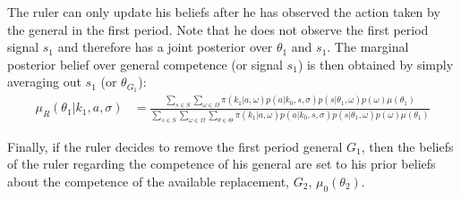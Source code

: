 \documentclass[11pt,]{article}
\begin{document}
The ruler can only update his beliefs after he has observed the action taken by the general in the first period.  Note that he does not observe the first period signal $s_1$ and therefore has a joint posterior over $\theta_{1}$ and $s_1$.  The marginal posterior belief over general competence (or signal $s_1$) is then obtained by simply averaging out $s_1$ (or $\theta_{G_1}$):
\begin{align}
\mu_R(\theta_{1}|k_1,a,\sigma)&=\frac{\sum_{s\in S}\sum_{\omega\in\Omega}\pi(k_1|a,\omega)p(a|k_0,s,\sigma)p(s| \theta_{1},\omega)p(\omega)\mu(\theta_{1})}{\sum_{s\in S}\sum_{\omega\in\Omega}\sum_{\theta\in\Theta}\pi(k_1|a,\omega)p(a|k_0,s,\sigma)p(s|\theta_{1},\omega)p(\omega)\mu(\theta_{1})}
\end{align}

\noindent Finally, if the ruler decides to remove the first period general $G_1$, then the beliefs of the ruler regarding the competence of his general are set to his prior beliefs about the competence of the available replacement, $G_2$, $\mu_0(\theta_2)$.
\end{document}
